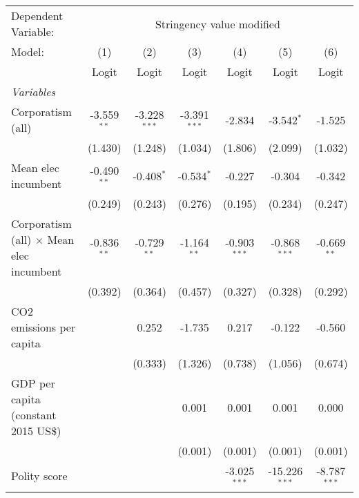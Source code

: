 
\begingroup
\centering
\begin{tabular}{lcccccc}
   \toprule
   Dependent Variable: & \multicolumn{6}{c}{Stringency value modified}\\
   Model:                                          & (1)           & (2)            & (3)            & (4)            & (5)             & (6)\\  
                                                   &  Logit        & Logit          & Logit          & Logit          & Logit           & Logit\\  
   \midrule
   \emph{Variables}\\
   Corporatism (all)                               & -3.559$^{**}$ & -3.228$^{***}$ & -3.391$^{***}$ & -2.834         & -3.542$^{*}$    & -1.525\\   
                                                   & (1.430)       & (1.248)        & (1.034)        & (1.806)        & (2.099)         & (1.032)\\   
   Mean elec incumbent                             & -0.490$^{**}$ & -0.408$^{*}$   & -0.534$^{*}$   & -0.227         & -0.304          & -0.342\\   
                                                   & (0.249)       & (0.243)        & (0.276)        & (0.195)        & (0.234)         & (0.247)\\   
   Corporatism (all) $\times$ Mean elec incumbent  & -0.836$^{**}$ & -0.729$^{**}$  & -1.164$^{**}$  & -0.903$^{***}$ & -0.868$^{***}$  & -0.669$^{**}$\\   
                                                   & (0.392)       & (0.364)        & (0.457)        & (0.327)        & (0.328)         & (0.292)\\   
   CO2 emissions per capita                        &               & 0.252          & -1.735         & 0.217          & -0.122          & -0.560\\   
                                                   &               & (0.333)        & (1.326)        & (0.738)        & (1.056)         & (0.674)\\   
   GDP per capita (constant 2015 US\$)             &               &                & 0.001          & 0.001          & 0.001           & 0.000\\   
                                                   &               &                & (0.001)        & (0.001)        & (0.001)         & (0.001)\\   
   Polity score                                    &               &                &                & -3.025$^{***}$ & -15.226$^{***}$ & -8.787$^{***}$\\   

\end{tabular}
